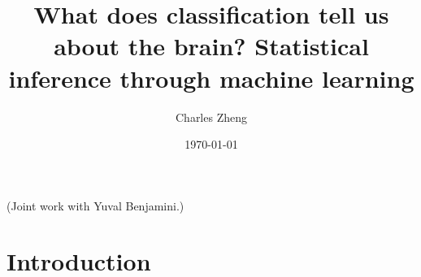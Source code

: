 \documentclass{beamer}
\title[Inference through learning]{What does classification tell us about the brain? Statistical inference through machine learning}
\author{Charles Zheng} %
\institute[Stanford] %
{Stanford University}
\date{\today} %
\begin{document}
\begin{frame}
\titlepage %
(Joint work with Yuval Benjamini.)
\end{frame}

\section{Introduction}






\end{document}

